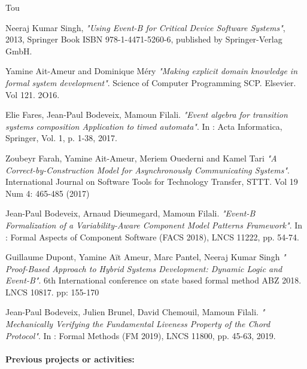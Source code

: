 \begin{sitedescription}{Tou}
\begin{compactitem}
\item Neeraj Kumar Singh, {\it "Using Event-B for Critical Device Software Systems"}, 2013, Springer Book ISBN 978-1-4471-5260-6, published by Springer-Verlag GmbH.
\item Yamine Ait-Ameur and Dominique M\'ery {\it "Making explicit domain knowledge in formal system development"}. Science of Computer Programming SCP. Elsevier. Vol 121.  2O16.
\item Elie Fares, Jean-Paul Bodeveix, Mamoun Filali. {\it "Event algebra for transition systems composition Application to timed automata"}. In : Acta Informatica, Springer, Vol. 1, p. 1-38,  2017. 
\item Zoubeyr Farah, Yamine Ait-Ameur, Meriem Ouederni and Kamel Tari {\it "A Correct-by-Construction Model for Asynchronously Communicating Systems"}. International Journal on Software Tools for Technology Transfer,  STTT. Vol 19 Num 4: 465-485 (2017)
\item Jean-Paul Bodeveix, Arnaud Dieumegard, Mamoun Filali. {\it "Event-B Formalization of a Variability-Aware Component Model Patterns Framework"}. In : Formal Aspects of Component Software (FACS 2018), LNCS 11222,  pp. 54-74. 
\item 	Guillaume Dupont, Yamine Aït Ameur, Marc Pantel, Neeraj Kumar Singh {\it " 
Proof-Based Approach to Hybrid Systems Development: Dynamic Logic and Event-B"}. 6th International conference on state based formal method ABZ 2018. LNCS 10817. pp: 155-170
\item Jean-Paul Bodeveix, Julien Brunel, David Chemouil, Mamoun Filali. {\it " Mechanically Verifying the Fundamental Liveness Property of the Chord Protocol"}. In : Formal Methods (FM 2019), LNCS  11800, pp. 45-63, 2019.
\end{compactitem}

\paragraph*{Previous projects or activities:}


\end{sitedescription}
